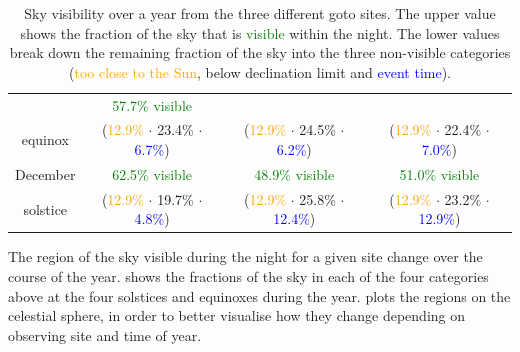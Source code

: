 \begin{colsection}
\begin{colsection}
\begin{table}[t]
\begin{center}
\begin{tabular}{c|ccc}
                      & \textcolor{Green}{57.7\% visible}
                      \\
            equinox   & {\scriptsize(\textcolor{Orange}{12.9\%} $\cdot$
                                     \textcolor{NavyBlue}{23.4\%} $\cdot$
                                     \textcolor{Blue}{6.7\%})}
                      & {\scriptsize(\textcolor{Orange}{12.9\%} $\cdot$
                                     \textcolor{NavyBlue}{24.5\%} $\cdot$
                                     \textcolor{Blue}{6.2\%})}
                      & {\scriptsize(\textcolor{Orange}{12.9\%} $\cdot$
                                     \textcolor{NavyBlue}{22.4\%} $\cdot$
                                     \textcolor{Blue}{7.0\%})}
                      \\[0.5cm]
            December  & \textcolor{Green}{62.5\% visible}
                      & \textcolor{Green}{48.9\% visible}
                      & \textcolor{Green}{51.0\% visible}
                      \\
            solstice  & {\scriptsize(\textcolor{Orange}{12.9\%} $\cdot$
                                     \textcolor{NavyBlue}{19.7\%} $\cdot$
                                     \textcolor{Blue}{4.8\%})}
                      & {\scriptsize(\textcolor{Orange}{12.9\%} $\cdot$
                                     \textcolor{NavyBlue}{25.8\%} $\cdot$
                                     \textcolor{Blue}{12.4\%})}
                      & {\scriptsize(\textcolor{Orange}{12.9\%} $\cdot$
                                     \textcolor{NavyBlue}{23.2\%} $\cdot$
                                     \textcolor{Blue}{12.9\%})}
                      \\
        \end{tabular}
    \end{center}
    \caption[Sky visibility over a year]{
        Sky visibility over a year from the three different \gls{goto} sites. The upper value shows the fraction of the sky that is \textcolor{Green}{visible} within the night. The lower values break down the remaining fraction of the sky into the three non-visible categories (\textcolor{Orange}{too close to the Sun}, \textcolor{NavyBlue}{below declination limit} and \textcolor{Blue}{event time}).
    }\label{tab:visibility}
\end{table}

The region of the sky visible during the night for a given site change over the course of the year.  shows the fractions of the sky in each of the four categories above at the four solstices and equinoxes during the year.  plots the regions on the celestial sphere, in order to better visualise how they change depending on observing site and time of year.


\end{colsection}
\end{colsection}
